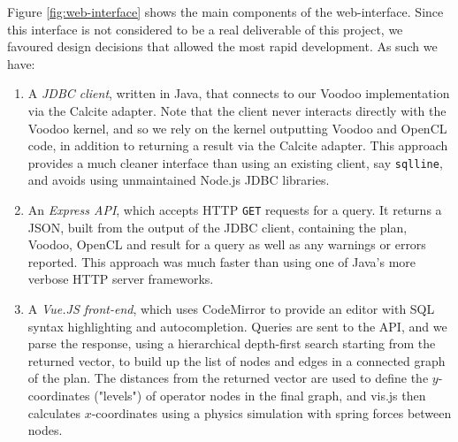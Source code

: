 Figure \ref{fig:web-interface} shows the main components of the web-interface. Since this interface is not considered to be a real deliverable of this project, we favoured design decisions that allowed the most rapid development. As such we have:

\begin{enumerate}
\item A \emph{JDBC client}, written in Java, that connects to our Voodoo implementation via the Calcite adapter. Note that the client never interacts directly with the Voodoo kernel, and so we rely on the kernel outputting Voodoo and OpenCL code, in addition to returning a result via the Calcite adapter. This approach provides a much cleaner interface than using an existing client, say \texttt{sqlline}, and avoids using unmaintained Node.js JDBC libraries.
\item An \emph{Express API}, which accepts HTTP \texttt{GET} requests for a query. It returns a JSON, built from the output of the JDBC client, containing the plan, Voodoo, OpenCL and result for a query as well as any warnings or errors reported. This approach was much faster than using one of Java's more verbose HTTP server frameworks.
\item A \emph{Vue.JS front-end}, which uses CodeMirror to provide an editor with SQL syntax highlighting and autocompletion. Queries are sent to the API, and we parse the response, using a hierarchical depth-first search starting from the returned vector, to build up the list of nodes and edges in a connected graph of the plan. The distances from the returned vector are used to define the $y$-coordinates ("levels") of operator nodes in the final graph, and vis.js then calculates $x$-coordinates using a physics simulation with spring forces between nodes.
\end{enumerate}

